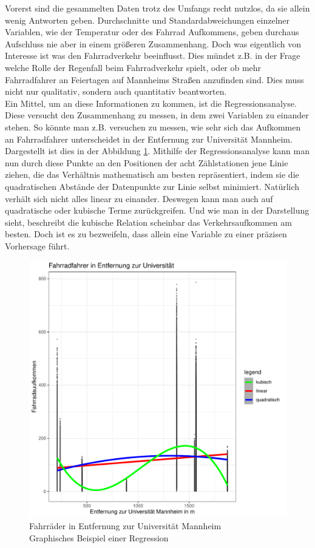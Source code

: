 \documentclass[a4paper,12pt]{thesis}
\begin{document}
Vorerst sind die gesammelten Daten trotz des Umfangs recht nutzlos, da sie allein wenig Antworten geben. Durchschnitte und Standardabweichungen einzelner Variablen, wie der Temperatur oder des Fahrrad Aufkommens, geben durchaus Aufschluss nie aber in einem größeren Zusammenhang. Doch was eigentlich von Interesse ist was den Fahrradverkehr beeinflusst. Dies mündet z.B. in der Frage welche Rolle der Regenfall beim Fahrradverkehr spielt, oder ob mehr Fahrradfahrer an Feiertagen auf Mannheims Straßen anzufinden sind. Dies muss nicht nur qualitativ, sondern auch quantitativ beantworten.\\
Ein Mittel, um an diese Informationen zu kommen, ist die Regressionsanalyse. Diese versucht den Zusammenhang zu messen, in dem zwei Variablen zu einander stehen. So könnte man z.B. versuchen zu messen, wie sehr sich das Aufkommen an Fahrradfahrer unterscheidet in der Entfernung zur Universität Mannheim. Dargestellt ist dies in der Abbildung \ref{Figure2}. Mithilfe der Regressionsanalyse kann man nun durch diese Punkte an den Positionen der acht Zählstationen jene Linie ziehen, die das Verhältnis mathematisch am besten repräsentiert, indem sie die quadratischen Abstände der Datenpunkte zur Linie selbst minimiert. Natürlich verhält sich nicht alles linear zu einander. Deswegen kann man auch auf quadratische oder kubische Terme zurückgreifen. Und wie man in der Darstellung sieht, beschreibt die kubische Relation scheinbar das Verkehrsaufkommen am besten. Doch ist es zu bezweifeln, dass allein eine Variable zu einer präzisen Vorhersage führt.\\

\begin{figure}[!ht]
	\centering
	\includegraphics[width=\textwidth]{Plots/Regression_Bsp.pdf}
	\caption{Fahrräder in Entfernung zur Universität Mannheim\\Graphisches Beispiel einer Regression}
	\label{Figure2}
\end{figure}
\end{document}
